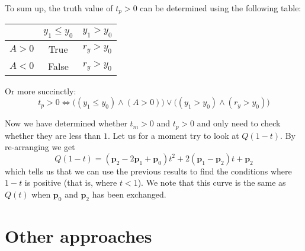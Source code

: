 \documentclass[11pt, a4paper]{article}
\renewcommand\vec[1]{\boldsymbol{#1}}
\begin{document}
To sum up, the truth value of $t_p > 0$ can be determined using the following table:
\begin{table}[H]
\centering
\begin{tabular}{c|c|c}
& $y_1 \leq y_0$ & $y_1 > y_0$ \\\hline
$A > 0$ & True & $r_y > y_0$ \\\hline
$A < 0$ & False & $r_y > y_0$
\end{tabular}
\end{table}
Or more succinctly:
\begin{equation*}
t_p > 0 \iff \big((y_1 \leq y_0) \land (A > 0)\big) \lor \big((y_1 > y_0) \land (r_y > y_0)\big)
\end{equation*}

Now we have determined whether $t_m > 0$ and $t_p > 0$ and only need to check whether they are less than $1$. Let us for a moment try to look at $Q(1-t)$. By re-arranging we get
\begin{equation}
Q(1-t) = (\vec p_2 - 2\vec p_1 + \vec p_0)t^2 + 2(\vec p_1 - \vec p_2)t + \vec p_2
\end{equation}
which tells us that we can use the previous results to find the conditions where $1-t$ is positive (that is, where $t < 1$). We note that this curve is the same as $Q(t)$ when $\vec p_0$ and $\vec p_2$ has been exchanged.

\section{Other approaches}
\end{document}
